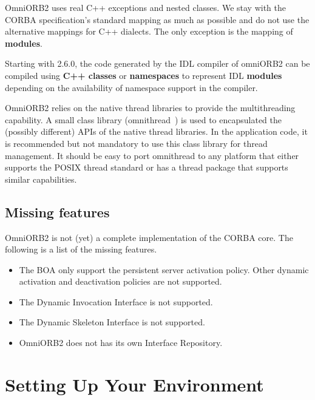 \documentclass[11pt,twoside,onecolumn]{book}
\begin{document}
OmniORB2 uses real C++ exceptions and nested classes. We stay with the
CORBA specification's standard mapping as much as possible and do not use
the alternative mappings for C++ dialects. The only exception is the
mapping of {\bf modules}.

Starting with 2.6.0, the code generated by the IDL compiler of omniORB2 can
be compiled using {\bf C++ classes} or {\bf namespaces} to represent IDL
{\bf modules} depending on the availability of namespace support in the
compiler.

OmniORB2 relies on the native thread libraries to provide the
multithreading capability. A small class library (omnithread~\cite{tjr96a})
is used to encapsulated the (possibly different) APIs of the native thread
libraries. In the application code, it is recommended but not mandatory to
use this class library for thread management. It should be easy to port
omnithread to any platform that either supports the POSIX thread standard
or has a thread package that supports similar capabilities.

\subsection{Missing features}

OmniORB2 is not (yet) a complete implementation of the CORBA core. 
The following is a list of the missing features. 

\begin{itemize}

\item The BOA only support the persistent server activation policy. Other
dynamic activation and deactivation policies are not supported.
\item The Dynamic Invocation Interface is not supported.
\item The Dynamic Skeleton Interface is not supported.
\item OmniORB2 does not has its own Interface Repository.
\end{itemize}



\section{Setting Up Your Environment}
\label{setup}
\end{document}
